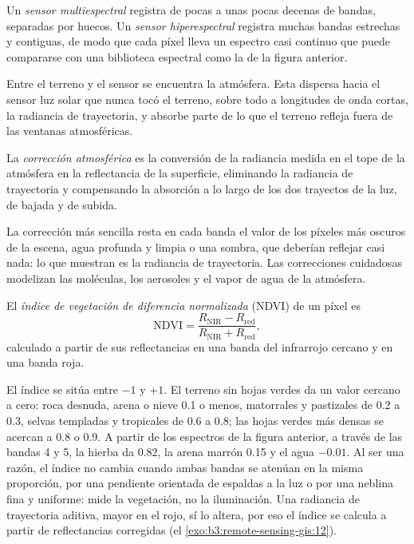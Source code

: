 \begin{definition}\label{def:b3:remote-sensing-gis:sensors}
Un \emph{sensor multiespectral} registra de pocas
a unas pocas decenas de bandas, separadas por huecos. Un \emph{sensor
hiperespectral} registra muchas bandas estrechas y contiguas,
de modo que cada píxel lleva un espectro casi continuo que puede
compararse con una biblioteca espectral como la de la figura anterior.
\end{definition}

Entre el terreno y el sensor se encuentra la atmósfera. Esta dispersa
hacia el sensor luz solar que nunca tocó el terreno, sobre todo a
longitudes de onda cortas, la radiancia de trayectoria, y absorbe parte de lo que el
terreno refleja fuera de las ventanas atmosféricas.

\begin{definition}\label{def:b3:remote-sensing-gis:atm-correction}
La \emph{corrección atmosférica} es la
conversión de la radiancia medida en el tope de la atmósfera en la
reflectancia de la superficie, eliminando la radiancia de trayectoria y compensando
la absorción a lo largo de los dos trayectos de la luz, de bajada y de subida.
\end{definition}

La corrección más sencilla resta en cada banda el valor de los píxeles más
oscuros de la escena, agua profunda y limpia o una sombra, que deberían reflejar
casi nada: lo que muestran es la radiancia de trayectoria. Las correcciones cuidadosas
modelizan las moléculas, los aerosoles y el vapor de agua de la atmósfera.

\begin{definition}\label{def:b3:remote-sensing-gis:ndvi}
El \emph{índice de vegetación de diferencia
normalizada} (NDVI) de un píxel es
\[
\mathrm{NDVI} = \frac{R_\mathrm{NIR} - R_\mathrm{red}}{R_\mathrm{NIR} + R_\mathrm{red}} ,
\]
calculado a partir de sus reflectancias en una banda del infrarrojo cercano y en una banda roja.
\end{definition}

El índice se sitúa entre $-1$ y $+1$. El terreno sin hojas verdes da un
valor cercano a cero: roca desnuda, arena o nieve \num{0.1} o menos,
matorrales y pastizales de 0.2 a 0.3, selvas templadas y tropicales de 0.6 a
0.8; las hojas verdes más densas se acercan a 0.8 o 0.9. A partir de los espectros de la
figura anterior, a través de las bandas 4 y 5, la hierba da 0.82, la arena marrón
0.15 y el agua $-0.01$. Al ser una razón, el índice no cambia cuando
ambas bandas se atenúan en la misma proporción, por una pendiente orientada de espaldas
a la luz o por una neblina fina y uniforme: mide la vegetación, no la
iluminación. Una radiancia de trayectoria aditiva, mayor en el rojo, sí lo altera,
por eso el índice se calcula a partir de reflectancias corregidas
(el \cref{exo:b3:remote-sensing-gis:12}).

